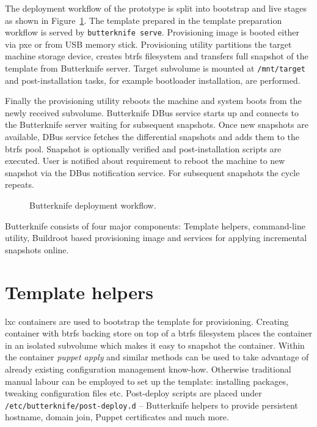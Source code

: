 \documentclass[a4paper,11pt]{kth-mag}
\begin{document}
The deployment workflow of the prototype is split into
bootstrap and live stages as shown in
Figure~\ref{fig:butterknife-workflow}.
The template prepared in the template preparation workflow
is served by \lstinline!butterknife serve!.
Provisioning image is booted either via
\acrfull{pxe} or from USB memory stick.
Provisioning utility
partitions the target machine storage device,
creates \acrshort{btrfs} filesystem and
transfers full snapshot of the template from Butterknife server.
Target subvolume is mounted at \lstinline!/mnt/target!
and post-installation tasks, for example
bootloader installation, are performed.

Finally the provisioning utility reboots the machine
and system boots from the newly received subvolume.
Butterknife DBus service starts up and
connects to the Butterknife server waiting for
subsequent snapshots.
Once new snapshots are available,
DBus service fetches the differential snapshots and
adds them to the \acrshort{btrfs} pool.
Snapshot is optionally verified and post-installation
scripts are executed.
User is notified about requirement to reboot the
machine to new snapshot via the DBus notification service.
For subsequent snapshots the cycle repeats.


\begin{figure}[!htb]
\centering
\scalebox{0.6}{}
\caption{Butterknife deployment workflow.}
\label{fig:butterknife-workflow}
\end{figure}



Butterknife consists of four major components:
Template helpers,
command-line utility,
Buildroot based provisioning image and
services for applying incremental snapshots online.





\section{Template helpers}

\acrshort{lxc} containers are used to bootstrap the template for provisioning.
Creating container with \acrshort{btrfs} backing store
on top of a \acrshort{btrfs} filesystem places the container in an
isolated subvolume which makes it easy to snapshot the container.
Within the container \emph{puppet apply} and similar methods can be used
to take advantage of already existing configuration management know-how.
Otherwise traditional manual labour can be employed
to set up the template: installing packages, tweaking configuration files etc.
Post-deploy scripts are placed under \lstinline!/etc/butterknife/post-deploy.d!
-- Butterknife helpers to provide persistent hostname, domain join,
Puppet certificates and much more.
\end{document}
